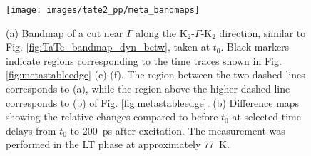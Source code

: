 \begin{figure}[th!]
	\centering
	\texttt{[image: images/tate2\_pp/meta\_bandmaps]}
	\caption{(a) Bandmap of a cut near $\Gamma$ along the K$_2$-$\Gamma$-K$_2$ direction, similar to Fig. \ref{fig:TaTe_bandmap_dyn_betw}, taken at $t_0$. Black markers indicate regions corresponding to the time traces shown in Fig. \ref{fig:metastableedge} (c)-(f). The region between the two dashed lines corresponds to (a), while the region above the higher dashed line corresponds to (b) of Fig. \ref{fig:metastableedge}. (b) Difference maps showing the relative changes compared to before $t_0$ at selected time delays from $t_0$ to \qty{200}{\pico\second} after excitation. The measurement was performed in the LT phase at approximately \qty{77}{\kelvin}.}
	\label{fig:tateltmetasteps}
\end{figure}


